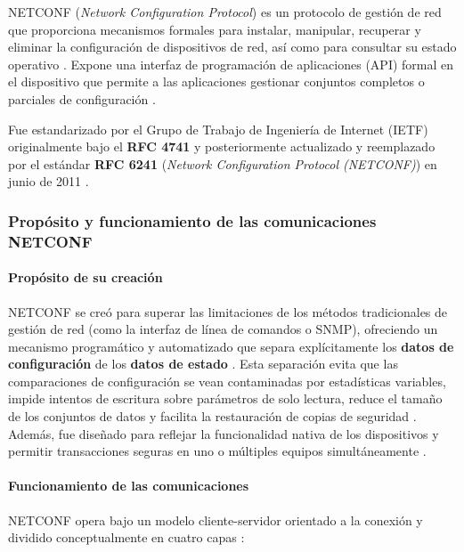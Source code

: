 \documentclass[12pt,a4paper]{article}
\begin{document}
NETCONF (\textit{Network Configuration Protocol}) es un protocolo de gestión de red que proporciona mecanismos formales para instalar, manipular, recuperar y eliminar la configuración de dispositivos de red, así como para consultar su estado operativo \parencite{enns2011rfc6241}. Expone una interfaz de programación de aplicaciones (API) formal en el dispositivo que permite a las aplicaciones gestionar conjuntos completos o parciales de configuración \parencite{enns2011rfc6241}.

Fue estandarizado por el Grupo de Trabajo de Ingeniería de Internet (IETF) originalmente bajo el \textbf{RFC 4741} y posteriormente actualizado y reemplazado por el estándar \textbf{RFC 6241} (\textit{Network Configuration Protocol (NETCONF)}) en junio de 2011 \parencite{enns2011rfc6241}.

\subsubsection{Propósito y funcionamiento de las comunicaciones NETCONF}

\paragraph{Propósito de su creación}

NETCONF se creó para superar las limitaciones de los métodos tradicionales de gestión de red (como la interfaz de línea de comandos o SNMP), ofreciendo un mecanismo programático y automatizado que separa explícitamente los \textbf{datos de configuración} de los \textbf{datos de estado} \parencite{enns2011rfc6241}. Esta separación evita que las comparaciones de configuración se vean contaminadas por estadísticas variables, impide intentos de escritura sobre parámetros de solo lectura, reduce el tamaño de los conjuntos de datos y facilita la restauración de copias de seguridad \parencite{enns2011rfc6241}. Además, fue diseñado para reflejar la funcionalidad nativa de los dispositivos y permitir transacciones seguras en uno o múltiples equipos simultáneamente \parencite{enns2011rfc6241}.

\paragraph{Funcionamiento de las comunicaciones}

NETCONF opera bajo un modelo cliente-servidor orientado a la conexión y dividido conceptualmente en cuatro capas \parencite{enns2011rfc6241}:
\end{document}
